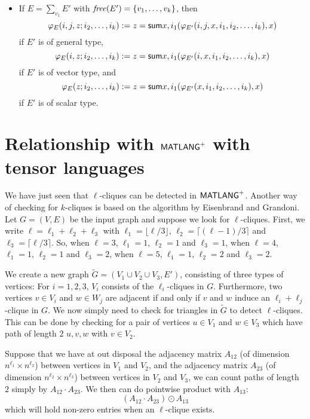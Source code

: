 \begin{itemize}
\item If $E = \sum_{v_1} E'$ with $\operatorname{\mathit{free}}(E')=\{v_1,\ldots,v_k\}$, then 
$$\varphi_E(i,j,z;i_2,\ldots,i_k):= z= \mathsf{sum} x,i_1 (\varphi_{E'}(i,j,x,i_1,i_2,\ldots,i_k),x)
$$ if $E'$ is of general type,
$$\varphi_E(i,z;i_2,\ldots,i_k):= z= \mathsf{sum} x,i_1 (\varphi_{E'}(i,x,i_1,i_2,\ldots,i_k),x)
$$ if $E'$ is of vector type, and
$$\varphi_E(z;i_2,\ldots,i_k):= z= \mathsf{sum} x,i_1 (\varphi_{E'}(x,i_1,i_2,\ldots,i_k),x)
$$ if $E'$ is of scalar type.



\end{itemize}

\section{Relationship with $\mathsf{MATLANG}^{\sf +}$ with tensor languages}
We have just seen that $\ell$-cliques can be detected in $\mathsf{MATLANG}^{\sf +}$. Another way of checking for $k$-cliques is based on the algorithm by Eisenbrand and Grandoni.
Let $G=(V,E)$ be the input graph and suppose we look for $\ell$-cliques. First, we write $\ell=\ell_1+\ell_2+\ell_3$ with $\ell_1=\lfloor\ell/3\rfloor$, $\ell_2=\lceil (\ell-1)/3\rceil$ and
$\ell_3=\lceil \ell/3\rceil$. So, when $\ell=3$, $\ell_1=1$, $\ell_2=1$ and $\ell_3=1$,
when $\ell=4$, $\ell_1=1$, $\ell_2=1$ and $\ell_3=2$, when $\ell=5$, $\ell_1=1$, $\ell_2=2$ and $\ell_3=2$.

We create a new graph $\tilde{G}=(V_1\cup V_2\cup V_3,E')$, consisting of three types of vertices: For $i=1,2,3$, $V_i$ consists of the $\ell_i$-cliques in $G$. Furthermore, two vertices $v\in V_i$ and $w\in W_j$
are adjacent if and only if $v$ and $w$ induce an $\ell_i+\ell_j$-clique in $G$. We now simply need to check for triangles in $\tilde{G}$ to detect $\ell$-cliques. This can be done by
checking for a pair of vertices $u\in V_1$ and $w\in V_3$ which have path of length $2$ $u,v,w$ with $v\in V_2$.

Suppose that we have at out disposal the adjacency matrix $A_{12}$ (of dimension $n^{\ell_1}\times n^{\ell_2}$) between vertices in $V_1$ and $V_2$,
and  the adjacency matrix $A_{23}$ (of dimension $n^{\ell_2}\times n^{\ell_3}$) between vertices in $V_2$ and $V_3$, we can count paths of length $2$
simply by $A_{12}\cdot A_{23}$. We then can do pointwise product with $A_{13}$:
$$(A_{12}\cdot A_{23})\odot A_{13}
$$
which will hold non-zero entries when an $\ell$-clique exists.

